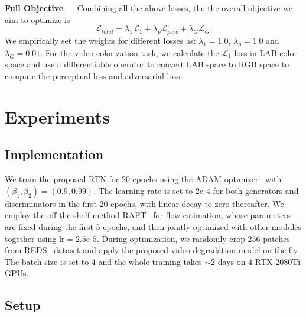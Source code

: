 \documentclass[10pt,twocolumn,letterpaper]{article}
\begin{document}
	
	\noindent\textbf{Full Objective}  ~~  Combining all the above losses, the
	the overall objective we aim to optimize is
	\begin{equation}
	\mathcal{L}_{total} = \lambda_{1}\mathcal{L}_{{1}}+\lambda_{p} \mathcal{L}_{perc} + \lambda_{G} \mathcal{L}_{G}.    
	\end{equation}
	We empirically set the weights for different losses as: $\lambda_{1}=1.0$, $\lambda_{p}=1.0$ and $\lambda_{G}=0.01$. For the video colorization task, we calculate the $\mathcal{L}_1$ loss in LAB color space and use a differentiable operator to convert LAB space to RGB space to compute the perceptual loss and adversarial loss. 
	
	
	
	
	
	
	\section{Experiments}
	
	
	\subsection{Implementation}
	We train the proposed RTN for 20 epochs using the ADAM optimizer~\cite{kingma2014adam} with $\left(\beta_{1}, \beta_{2}\right)=(0.9,0.99)$. The learning rate is set to $2\text{e-}4$ for both generators and discriminators in the first 20 epochs, with linear decay to zero thereafter. We employ the off-the-shelf method RAFT~\cite{teed2020raft} for flow estimation, whose parameters are fixed during the first 5 epochs, and then jointly optimized with other modules together using $\text{lr} = 2.5\text{e-}5$. During optimization, we randomly crop $256$ patches from REDS~\cite{Nah_2019_CVPR_Workshops_REDS} dataset and apply the proposed video degradation model on the fly. The batch size is set to $4$ and the whole training takes $\sim 2$ days on $4$ RTX 2080Ti GPUs.
	
	\subsection{Setup}
	
\end{document}
